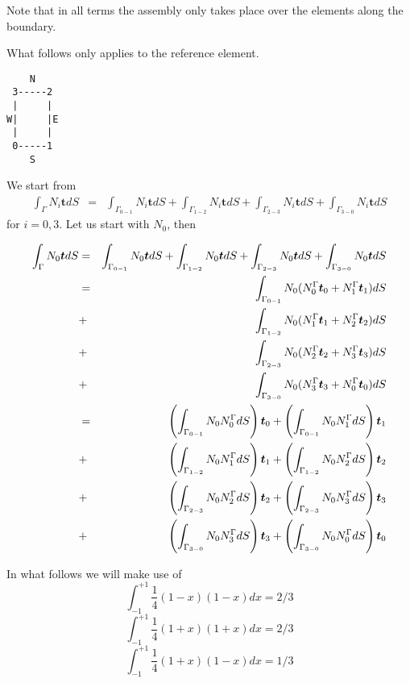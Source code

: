 Note that in all terms the assembly only takes place over the elements along the boundary.







\newpage
What follows only applies to the reference element.

\begin{verbatim}
    N
 3-----2
 |     |
W|     |E
 |     |
 0-----1
    S
\end{verbatim}

We start from 
\begin{eqnarray}
\int_{\Gamma} N_i {\bm t} dS 
&=& 
 \int_{\Gamma_{0-1}} N_i {\bm t} dS  
+\int_{\Gamma_{1-2}} N_i {\bm t} dS  
+\int_{\Gamma_{2-3}} N_i {\bm t} dS  
+\int_{\Gamma_{3-0}} N_i {\bm t} dS
\end{eqnarray}
for $i=0,3$. Let us start with $N_0$, then 

\begin{eqnarray}
\int_{\Gamma} N_0 {\bm t} dS 
&=& 
 \int_{\Gamma_{0-1}} N_0 {\bm t} dS  
+\int_{\Gamma_{1-2}} N_0 {\bm t} dS  
+\int_{\Gamma_{2-3}} N_0 {\bm t} dS  
+\int_{\Gamma_{3-0}} N_0 {\bm t} dS \nonumber\\
&=& \int_{\Gamma_{0-1}} N_0 (N_0^\Gamma {\bm t}_0 + N_1^\Gamma {\bm t}_1) dS \nonumber\\ 
&+& \int_{\Gamma_{1-2}} N_0 (N_1^\Gamma {\bm t}_1 + N_2^\Gamma {\bm t}_2) dS \nonumber\\
&+& \int_{\Gamma_{2-3}} N_0 (N_2^\Gamma {\bm t}_2 + N_3^\Gamma {\bm t}_3) dS \nonumber\\
&+& \int_{\Gamma_{3-0}} N_0 (N_3^\Gamma {\bm t}_3 + N_0^\Gamma {\bm t}_0) dS \nonumber\\ 
&=& \left( \int_{\Gamma_{0-1}} N_0 N_0^\Gamma dS \right) {\bm t}_0 + \left( \int_{\Gamma_{0-1}} N_0 N_1^\Gamma dS\right) {\bm t}_1 \nonumber\\ 
&+& \left( \int_{\Gamma_{1-2}} N_0 N_1^\Gamma dS \right) {\bm t}_1 + \left( \int_{\Gamma_{1-2}} N_0 N_2^\Gamma dS\right) {\bm t}_2 \nonumber\\
&+& \left( \int_{\Gamma_{2-3}} N_0 N_2^\Gamma dS \right) {\bm t}_2 + \left( \int_{\Gamma_{2-3}} N_0 N_3^\Gamma dS\right) {\bm t}_3 \nonumber\\
&+& \left( \int_{\Gamma_{3-0}} N_0 N_3^\Gamma dS \right) {\bm t}_3 + \left( \int_{\Gamma_{3-0}} N_0 N_0^\Gamma dS\right) {\bm t}_0 \nonumber  
\end{eqnarray}

In what follows we will make use of 
\[
\int_{-1}^{+1} \frac{1}{4} (1-x)(1-x) dx = 2/3 
\]
\[
\int_{-1}^{+1} \frac{1}{4} (1+x)(1+x) dx = 2/3 
\]
\[
\int_{-1}^{+1} \frac{1}{4} (1+x)(1-x) dx = 1/3 
\]



